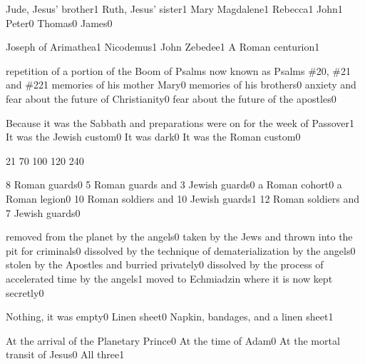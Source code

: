 {Jude, Jesus' brother}{1}
{Ruth, Jesus' sister}{1}
{Mary Magdalene}{1}
{Rebecca}{1}
{John}{1}
{Peter}{0}
{Thomas}{0}
{James}{0}
\qstop

{Joseph of Arimathea}{1}
{Nicodemus}{1}
{John Zebedee}{1}
{A Roman centurion}{1}
\qstop

{repetition of a portion of the Boom of Psalms now known as Psalms \#20, \#21 and \#22}{1}
{memories of his mother Mary}{0}
{memories of his brothers}{0}
{anxiety and fear about the future of Christianity}{0}
{fear about the future of the apostles}{0}
\qstop


{Because it was the Sabbath and preparations were on for the week of Passover}{1}
{It was the Jewish custom}{0}
{It was dark}{0}
{It was the Roman custom}{0}
\qstop

{2}{1}
{7}{0}
{10}{0}
{12}{0}
{24}{0}
\qstop

{8 Roman guards}{0}
{5 Roman guards and 3 Jewish guards}{0}
{a Roman cohort}{0}
{a Roman legion}{0}
{10 Roman soldiers and 10 Jewish guards}{1}
{12 Roman soldiers and 7 Jewish guards}{0}
\qstop


{removed from the planet by the angels}{0}
{taken by the Jews and thrown into the pit for criminals}{0}
{dissolved by the technique of dematerialization by the angels}{0}
{stolen by the Apostles and burried privately}{0}
{dissolved by the process of accelerated time by the angels}{1}
{moved to Echmiadzin where it is now kept secretly}{0}
\qstop

{Nothing, it was empty}{0}
{Linen sheet}{0}
{Napkin, bandages, and a linen sheet}{1}
\qstop

{At the arrival of the Planetary Prince}{0}
{At the time of Adam}{0}
{At the mortal transit of Jesus}{0}
{All three}{1}
\qstop

